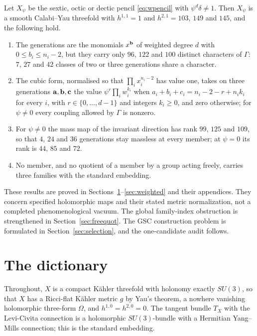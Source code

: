 \begin{theorem}\label{thm:E}
Let $X_\psi$ be the sextic, octic or dectic pencil \eqref{eq:wpencil} with
$\psi^d\delta\ne1$. Then $X_\psi$ is a smooth Calabi--Yau threefold with
$h^{1,1}=1$ and $h^{2,1}=103$, $149$ and $145$, and the following hold.
\begin{enumerate}[label=\textup{(\roman*)},leftmargin=*,itemsep=1pt]
\item The generations are the monomials $x^{\mathbf{b}}$ of weighted degree $d$
with $0\le b_i\le n_i-2$, but they carry only $96$, $122$ and $100$
distinct characters of $\Gamma$: $7$, $27$ and $42$ classes of two or three
generations share a character.
\item The cubic form, normalised so that $\prod_ix_i^{n_i-2}$ has value
one, takes on three generations $\mathbf{a},\mathbf{b},\mathbf{c}$ the value
$\psi^r\prod_iw_i^{k_i}$ when $a_i+b_i+c_i=n_i-2-r+n_ik_i$ for every $i$,
with $r\in\{0,\dots,d-1\}$ and integers $k_i\ge0$, and zero otherwise; for
$\psi\ne0$ every coupling allowed by $\Gamma$ is nonzero.
\item For $\psi\ne0$ the mass map of the invariant direction has rank
$99$, $125$ and $109$, so that $4$, $24$ and $36$ generations stay massless
at every member; at $\psi=0$ its rank is $44$, $85$ and $72$.
\item No member, and no quotient of a member by a group acting freely,
carries three families with the standard embedding.
\end{enumerate}
\end{theorem}




These results are proved in Sections~\ref{sec:dictionary}--\ref{sec:weighted}
and their appendices. They concern specified holomorphic maps and
their stated metric normalization, not a completed phenomenological
vacuum. The global family-index obstruction is strengthened in
Section~\ref{sec:freequot}. The GSC construction problem is formulated
in Section~\ref{sec:selection}, and the one-candidate audit follows.


\section{The dictionary}\label{sec:dictionary}

Throughout, $X$ is a compact K\"ahler threefold with holonomy exactly
$SU(3)$, so that $X$ has a Ricci-flat K\"ahler metric $g$ by Yau's
theorem, a nowhere vanishing holomorphic three-form $\Omega$, and
$h^{1,0}=h^{2,0}=0$. The tangent bundle $T_X$ with the Levi-Civita
connection is a holomorphic $SU(3)$-bundle with a Hermitian Yang--Mills
connection; this is the standard embedding.

